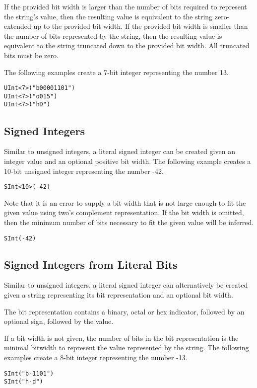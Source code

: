 \documentclass[12pt]{article}
\begin{document}
If the provided bit width is larger than the number of bits required to represent the string's value, then the resulting value is equivalent to the string zero-extended up to the provided bit width. If the provided bit width is smaller than the number of bits represented by the string, then the resulting value is equivalent to the string truncated down to the provided bit width. All truncated bits must be zero.

The following examples create a 7-bit integer representing the number 13.
\begin{lstlisting}
UInt<7>("b00001101")
UInt<7>("o015")
UInt<7>("hD")
\end{lstlisting}

\subsection{Signed Integers}

Similar to unsigned integers, a literal signed integer can be created given an integer value and an optional positive bit width. The following example creates a 10-bit unsigned integer representing the number -42. 
\begin{lstlisting}
SInt<10>(-42)
\end{lstlisting}

Note that it is an error to supply a bit width that is not large enough to fit the given value using two's complement representation. If the bit width is omitted, then the minimum number of bits necessary to fit the given value will be inferred.
\begin{lstlisting}
SInt(-42)
\end{lstlisting}

\subsection{Signed Integers from Literal Bits}

Similar to unsigned integers, a literal signed integer can alternatively be created given a string representing its bit representation and an optional bit width.

The bit representation contains a binary, octal or hex indicator, followed by an optional sign, followed by the value.

If a bit width is not given, the number of bits in the bit representation is the minimal bitwidth to represent the value represented by the string. The following examples create a 8-bit integer representing the number -13.
\begin{lstlisting}
SInt("b-1101")
SInt("h-d")
\end{lstlisting}
\end{document}
